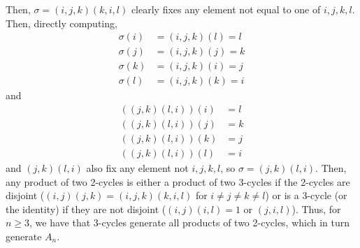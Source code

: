 \documentclass[12pt,letterpaper]{article}
\theoremstyle{definition}
\begin{document}
Then, $\sigma = (i,j,k)(k,i,l)$ clearly fixes any element not equal to one of $i,j,k,l$. Then, directly computing,
\begin{align*}
  \sigma(i) &= (i,j,k)(l) = l \\
  \sigma(j) &= (i,j,k)(j) = k \\
  \sigma(k) &= (i,j,k)(i) = j \\
  \sigma(l) &= (i,j,k)(k) = i
\end{align*}
and
\begin{align*}
  ((j,k)(l,i))(i) &= l \\
  ((j,k)(l,i))(j) &= k \\
  ((j,k)(l,i))(k) &= j \\
  ((j,k)(l,i))(l) &= i
\end{align*}
and $(j,k)(l,i)$ also fix any element not $i,j,k,l$, so $\sigma = (j,k)(l,i)$. Then, any product of two 2-cycles is either a product of two 3-cycles if the 2-cycles are disjoint ($(i,j)(j,k) = (i,j,k)(k,i,l)$ for $i\neq j \neq k \neq l$) or is a 3-cycle (or the identity) if they are not disjoint ($(i,j)(i,l) = 1$ or $(j,i,l)$). Thus, for $n \geq 3$, we have that 3-cycles generate all products of two 2-cycles, which in turn generate $A_{n}$.
\end{document}
